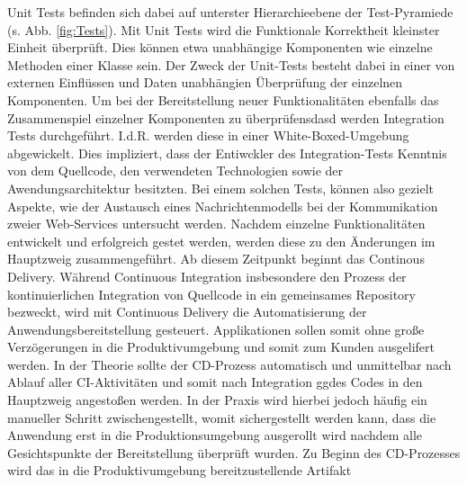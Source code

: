 \vspace*{-10mm}
Unit Tests befinden sich dabei auf unterster Hierarchieebene der Test-Pyramiede (s. Abb. \ref*{fig:Tests}). Mit Unit Tests wird die Funktionale Korrektheit kleinster Einheit überprüft. Dies können etwa unabhängige Komponenten wie einzelne Methoden einer Klasse sein. Der Zweck der Unit-Tests besteht dabei in einer von externen Einflüssen und Daten unabhängien Überprüfung der einzelnen Komponenten. Um bei der Bereitstellung neuer Funktionalitäten ebenfalls das Zusammenspiel einzelner Komponenten zu überprüfensdasd werden Integration Tests durchgeführt. I.d.R. werden diese in einer White-Boxed-Umgebung abgewickelt. Dies impliziert, dass der Entiwckler des Integration-Tests Kenntnis von dem Quellcode, den verwendeten Technologien sowie der Awendungsarchitektur besitzten. Bei einem solchen Tests, können also gezielt Aspekte, wie der Austausch eines Nachrichtenmodells bei der Kommunikation zweier Web-Services untersucht werden. Nachdem einzelne Funktionalitäten entwickelt und erfolgreich gestet werden, werden diese zu den Änderungen im Hauptzweig zusammengeführt. Ab diesem Zeitpunkt beginnt das Continous Delivery.  Während Continuous Integration insbesondere den Prozess der kontinuierlichen Integration von Quellcode in ein gemeinsames Repository bezweckt, wird mit Continuous Delivery die Automatisierung der Anwendungsbereitstellung gesteuert. Applikationen sollen somit ohne große Verzögerungen in die Produktivumgebung und somit zum Kunden ausgelifert werden. In der Theorie sollte der CD-Prozess automatisch und unmittelbar nach Ablauf aller CI-Aktivitäten und somit nach Integration ggdes Codes in den Hauptzweig angestoßen werden. In der Praxis wird hierbei jedoch häufig ein manueller Schritt zwischengestellt, womit sichergestellt werden kann, dass die Anwendung erst in die Produktionsumgebung ausgerollt wird nachdem alle Gesichtspunkte der Bereitstellung überprüft wurden. Zu Beginn des CD-Prozesses wird das in die Produktivumgebung bereitzustellende Artifakt 
